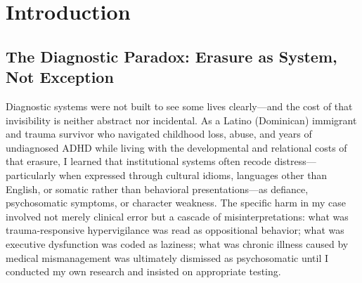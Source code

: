 \documentclass[12pt,a4paper]{article}
\begin{document}
\begin{abstract}
\vspace{0.5em}

The central thesis is that diagnostic AI must be treated as a justice-critical institution with enforceable equity requirements, not optional enhancements. If documented diagnostic harm concentrates in CLD populations—a reality my ED415 research confirms—and those populations carry historical legacies of medical neglect and racialized dismissal, then precaution is not perfectionism—it is a basic safety stance. EQUITAS operationalizes this principle through explicit performance thresholds (equalized-odds gaps $\leq 3\%$, true-positive-rate ratios $0.9$--$1.1$), mandatory community veto authority, continuous monitoring with automatic escalation and suspension protocols, and public harm ledgers that document where benefits and harms fall. The call to action is not simply ``build fairer models.'' It is to change who gets to decide what ``fair'' means and what happens when fairness fails.

\vspace{0.5em}


\end{abstract}

\clearpage
\footnotesize\tableofcontents
\clearpage

\section{Introduction}

\subsection{The Diagnostic Paradox: Erasure as System, Not Exception}

Diagnostic systems were not built to see some lives clearly—and the cost of that invisibility is neither abstract nor incidental. As a Latino (Dominican) immigrant and trauma survivor who navigated childhood loss, abuse, and years of undiagnosed ADHD while living with the developmental and relational costs of that erasure, I learned that institutional systems often recode distress—particularly when expressed through cultural idioms, languages other than English, or somatic rather than behavioral presentations—as defiance, psychosomatic symptoms, or character weakness.\cite{garcia_ed415} The specific harm in my case involved not merely clinical error but a cascade of misinterpretations: what was trauma-responsive hypervigilance was read as oppositional behavior; what was executive dysfunction was coded as laziness; what was chronic illness caused by medical mismanagement was ultimately dismissed as psychosomatic until I conducted my own research and insisted on appropriate testing.\cite{garcia_ed415}
\end{document}
